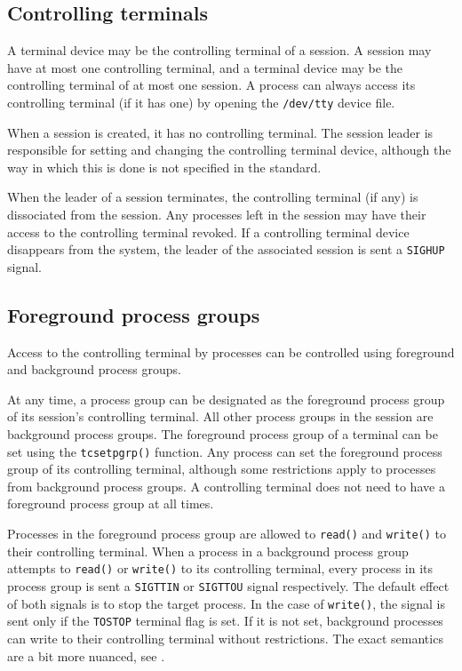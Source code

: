 \documentclass[shortabstract, manyadvisors, english, mgr]{iithesis}
\begin{document}
\subsection{Controlling terminals}
A terminal device may be the controlling terminal of a session. A session may
have at most one controlling terminal, and a terminal device may be the controlling
terminal of at most one session. A process can always access its controlling
terminal (if it has one) by opening the \texttt{/dev/tty} device file.

When a session is created, it has no controlling terminal. The session leader is
responsible for setting and changing the controlling terminal device, although
the way in which this is done is not specified in the standard.

When the leader of a session terminates, the controlling terminal (if any) is
dissociated from the session. Any processes left in the session may have their
access to the controlling terminal revoked. If a controlling terminal device
disappears from the system, the leader of the associated session is sent a
\texttt{SIGHUP} signal.

\subsection{Foreground process groups}
Access to the controlling terminal by processes can be controlled using
foreground and background process groups.

At any time, a process group can be designated as the foreground process group
of its session's controlling terminal. All other process groups in the session
are background process groups. The foreground process group of a terminal can be
set using the \texttt{tcsetpgrp()}\cite{tcsetpgrp} function. Any process can set
the foreground process group of its controlling terminal, although some
restrictions apply to processes from background process groups. A controlling
terminal does not need to have a foreground process group at all times.

Processes in the foreground process group are allowed to \texttt{read()} and
\texttt{write()} to their controlling terminal. When a process in a background
process group attempts to \texttt{read()} or \texttt{write()} to its controlling
terminal, every process in its process group is sent a \texttt{SIGTTIN} or
\texttt{SIGTTOU} signal respectively. The default effect of both signals is to
stop the target process. In the case of \texttt{write()}, the signal is sent
only if the \texttt{TOSTOP} terminal flag is set. If it is not set, background
processes can write to their controlling terminal without restrictions. The
exact semantics are a bit more nuanced, see \cite{terminal-access}.
\end{document}
